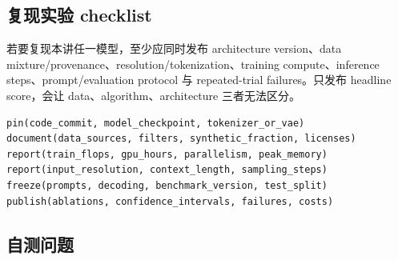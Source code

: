 \documentclass[a4paper]{article}
\begin{document}
\subsection{复现实验 checklist}

若要复现本讲任一模型，至少应同时发布 architecture version、data mixture/provenance、resolution/tokenization、training compute、inference steps、prompt/evaluation protocol 与 repeated-trial failures。只发布 headline score，会让 data、algorithm、architecture 三者无法区分。

\begin{lstlisting}[caption={跨 LLM/VLM/diffusion 的统一复现清单}]
pin(code_commit, model_checkpoint, tokenizer_or_vae)
document(data_sources, filters, synthetic_fraction, licenses)
report(train_flops, gpu_hours, parallelism, peak_memory)
report(input_resolution, context_length, sampling_steps)
freeze(prompts, decoding, benchmark_version, test_split)
publish(ablations, confidence_intervals, failures, costs)
\end{lstlisting}

\subsection{自测问题}
\end{document}

